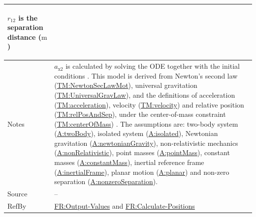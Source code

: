 \documentclass[12pt]{article}
\begin{document}
\begin{minipage}{\textwidth}
\begin{tabular}{>{\raggedright}p{}>{\raggedright\arraybackslash}p{}}
\begin{symbDescription}
              \item{${r_{12}}$ is the separation distance (${\text{m}}$)}
              \end{symbDescription}
\\ \midrule
Notes & ${a_{\text{x}2}}$ is calculated by solving the ODE together with the initial conditions . This model is derived from Newton's second law (\hyperref[TM:NewtonSecLawMot]{TM:NewtonSecLawMot}), universal gravitation (\hyperref[TM:UniversalGravLaw]{TM:UniversalGravLaw}), and the definitions of acceleration (\hyperref[TM:acceleration]{TM:acceleration}), velocity (\hyperref[TM:velocity]{TM:velocity}) and relative position (\hyperref[TM:relPosAndSep]{TM:relPosAndSep}), under the center-of-mass constraint (\hyperref[TM:centerOfMass]{TM:centerOfMass}) . The assumptions are: two-body system (\hyperref[twoBody]{A:twoBody}), isolated system (\hyperref[isolated]{A:isolated}), Newtonian gravitation (\hyperref[newtonianGravity]{A:newtonianGravity}), non-relativistic mechanics (\hyperref[nonRelativistic]{A:nonRelativistic}), point masses (\hyperref[pointMass]{A:pointMass}), constant masses (\hyperref[constantMass]{A:constantMass}), inertial reference frame (\hyperref[inertialFrame]{A:inertialFrame}), planar motion (\hyperref[planar]{A:planar}) and non-zero separation (\hyperref[nonzeroSeparation]{A:nonzeroSeparation}).
        
\\ \midrule
Source & --
         
\\ \midrule
RefBy & \hyperref[outputValues]{FR:Output-Values} and \hyperref[calcPositions]{FR:Calculate-Positions}
        
\\ \bottomrule
\end{tabular}
\end{minipage}
\end{document}
